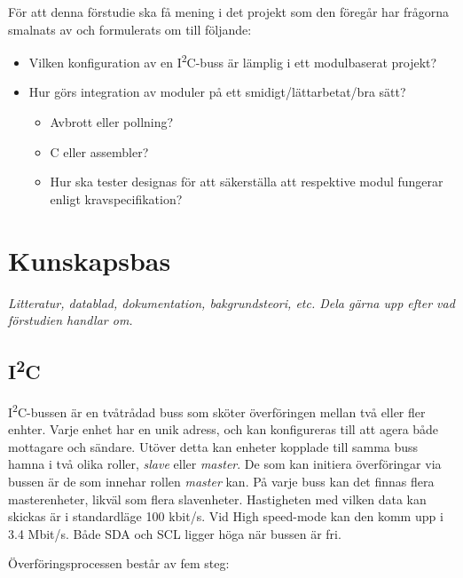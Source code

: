\documentclass[11pt]{article}
\begin{document}
\begin{flushleft}
För att denna förstudie ska få mening i det projekt som den föregår har frågorna smalnats av och formulerats om till följande:

\begin{itemize}
	\item Vilken konfiguration av en I\textsuperscript{2}C-buss är lämplig i ett modulbaserat projekt?
	\item Hur görs integration av moduler på ett smidigt/lättarbetat/bra sätt?
	
		\begin{itemize}
			\item Avbrott eller pollning?
			\item C eller assembler?
			\item Hur ska tester designas för att säkerställa att respektive modul fungerar enligt kravspecifikation?
		\end{itemize}

\end{itemize}

\pagebreak

\section{Kunskapsbas}
\textit{Litteratur, datablad, dokumentation, bakgrundsteori, etc. Dela gärna upp efter vad förstudien handlar om.}

\subsection{I\textsuperscript{2}C}

I\textsuperscript{2}C-bussen är en tvåtrådad buss som sköter överföringen mellan två eller fler enhter. Varje enhet har en unik adress, och kan konfigureras till att agera både mottagare och sändare. Utöver detta kan enheter kopplade till samma buss hamna i två olika roller, \textit{slave} eller \textit{master}. De som kan initiera överföringar via bussen är de som innehar rollen \textit{master} kan. På varje buss kan det finnas flera masterenheter, likväl som flera slavenheter. Hastigheten med vilken data kan skickas är i standardläge 100 kbit/s. Vid High speed-mode kan den komm upp i 3.4 Mbit/s. Både SDA och SCL ligger höga när bussen är fri.

Överföringsprocessen består av fem steg: 


\end{flushleft}
\end{document}
